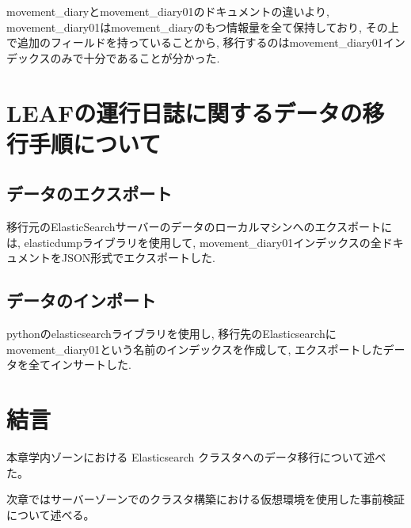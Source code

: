 movement\_diaryとmovement\_diary01のドキュメントの違いより, movement\_diary01はmovement\_diaryのもつ情報量を全て保持しており, その上で追加のフィールドを持っていることから, 移行するのはmovement\_diary01インデックスのみで十分であることが分かった.

\section{LEAFの運行日誌に関するデータの移行手順について}

\subsection{データのエクスポート}
移行元のElasticSearchサーバーのデータのローカルマシンへのエクスポートには, elasticdumpライブラリを使用して, movement\_diary01インデックスの全ドキュメントをJSON形式でエクスポートした.

\subsection{データのインポート}
pythonのelasticsearchライブラリを使用し, 移行先のElasticsearchにmovement\_diary01という名前のインデックスを作成して, エクスポートしたデータを全てインサートした.

\section{結言}
本章学内ゾーンにおける Elasticsearch クラスタへのデータ移行について述べた。

次章ではサーバーゾーンでのクラスタ構築における仮想環境を使用した事前検証について述べる。